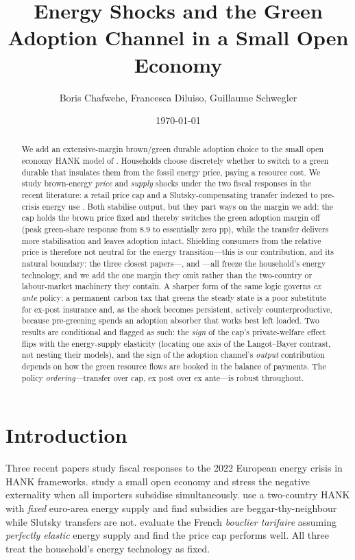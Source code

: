 \documentclass[11pt,a4paper]{article}
\title{\textbf{Energy Shocks and the Green Adoption Channel in a Small Open Economy}}
\author{Boris Chafwehe, Francesca Diluiso, Guillaume Schwegler}
\date{\today}
\begin{document}
\maketitle

\begin{abstract}
\noindent We add an extensive-margin brown/green durable adoption choice to the
small open economy HANK model of \citet{ARS2024}. Households choose discretely
whether to switch to a green durable that insulates them from the fossil energy
price, paying a resource cost. We study brown-energy \emph{price} and
\emph{supply} shocks under the two fiscal responses in the recent literature: a
retail price cap \citep{Langot2026} and a Slutsky-compensating transfer indexed
to pre-crisis energy use \citep{Bayer2026}. Both stabilise output, but they part
ways on the margin we add: the cap holds the brown price fixed and thereby
switches the green adoption margin off (peak green-share response from $8.9$ to
essentially zero pp), while the transfer delivers more stabilisation and leaves
adoption intact. Shielding consumers from the relative price is therefore not
neutral for the energy transition---this is our contribution, and its natural
boundary: the three closest papers---\citet{ARS2024}, \citet{Bayer2026} and
\citet{Langot2026}---all freeze the household's energy technology, and we add the
one margin they omit rather than the two-country or labour-market machinery they
contain. A sharper form of the same logic governs \emph{ex ante} policy: a
permanent carbon tax that greens the steady state is a poor substitute for
ex-post insurance and, as the shock becomes persistent, actively
counterproductive, because pre-greening spends an adoption absorber that works
best left loaded. Two results are conditional and flagged as such: the \emph{sign}
of the cap's private-welfare effect flips with the energy-supply elasticity
(locating one axis of the Langot--Bayer contrast, not nesting their models), and
the sign of the adoption channel's \emph{output} contribution depends on how the
green resource flows are booked in the balance of payments. The policy
\emph{ordering}---transfer over cap, ex post over ex ante---is robust throughout.
\end{abstract}

\section{Introduction}

Three recent papers study fiscal responses to the 2022 European energy crisis
in HANK frameworks. \citet{ARS2024} study a small open economy and stress the
negative externality when all importers subsidise simultaneously.
\citet{Bayer2026} use a two-country HANK with \emph{fixed} euro-area energy
supply and find subsidies are beggar-thy-neighbour while Slutsky transfers are
not. \citet{Langot2026} evaluate the French \emph{bouclier tarifaire} assuming
\emph{perfectly elastic} energy supply and find the price cap performs well. All
three treat the household's energy technology as fixed.
\end{document}
